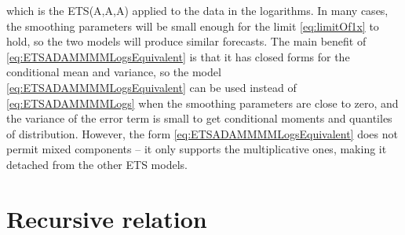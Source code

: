 \documentclass[]{book}
\theoremstyle{definition}
\theoremstyle{definition}
\theoremstyle{definition}
\theoremstyle{definition}
\theoremstyle{remark}
\begin{document}
which is the ETS(A,A,A) applied to the data in the logarithms. In many cases, the smoothing parameters will be small enough for the limit \eqref{eq:limitOf1x} to hold, so the two models will produce similar forecasts. The main benefit of \eqref{eq:ETSADAMMMMLogsEquivalent} is that it has closed forms for the conditional mean and variance, so the model \eqref{eq:ETSADAMMMMLogsEquivalent} can be used instead of \eqref{eq:ETSADAMMMMLogs} when the smoothing parameters are close to zero, and the variance of the error term is small to get conditional moments and quantiles of distribution. However, the form \eqref{eq:ETSADAMMMMLogsEquivalent} does not permit mixed components -- it only supports the multiplicative ones, making it detached from the other ETS models.

\hypertarget{adamETSPuremultiplicativeRecursive}{%
\section{Recursive relation}\label{adamETSPuremultiplicativeRecursive}}
\end{document}
